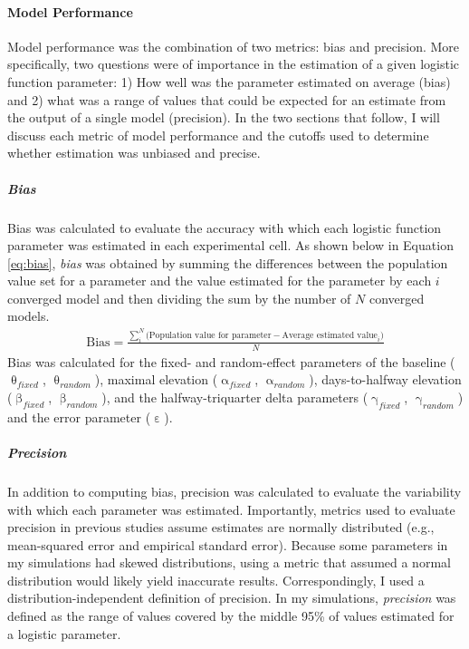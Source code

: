 \documentclass[
12pt, %
twoside,
english]{guelphthesis}
\begin{document}
\hypertarget{model-performance-1}{%
\paragraph{Model Performance}\label{model-performance-1}}

Model performance was the combination of two metrics: bias and precision. More specifically, two questions were of importance in the estimation of a given logistic function parameter: 1) How well was the parameter estimated on average (bias) and 2) what was a range of values that could be expected for an estimate from the output of a single model (precision). In the two sections that follow, I will discuss each metric of model performance and the cutoffs used to determine whether estimation was unbiased and precise.

\hypertarget{bias-comp}{%
\subparagraph{Bias}\label{bias-comp}}

Bias was calculated to evaluate the accuracy with which each logistic
function parameter was estimated in each experimental cell. As shown below in Equation
\eqref{eq:bias}, \emph{bias} was obtained by summing the differences
between the population value set for a parameter and the value estimated for the parameter by each \(i\) converged model and then dividing the sum by the number of \(N\) converged models.
\begin{align}
  \text{Bias} = \frac{\sum_i^N\text{(Population value for parameter} - \text{Average estimated value}_i)}{N}
  \label{eq:bias} 
\end{align}
\noindent Bias was calculated for the fixed- and random-effect parameters of the baseline (\(\uptheta_{fixed}\), \(\uptheta_{random}\)), maximal elevation (\(\upalpha_{fixed}\), \(\upalpha_{random}\)), days-to-halfway elevation (\(\upbeta_{fixed}\), \(\upbeta_{random}\)), and the halfway-triquarter delta parameters (\(\upgamma_{fixed}\), \(\upgamma_{random}\)) and the error parameter (\(\upepsilon\)).

\hypertarget{pres-precision}{%
\subparagraph{Precision}\label{pres-precision}}

In addition to computing bias, precision was calculated to evaluate the variability with which each parameter was estimated. Importantly, metrics used to evaluate precision in previous studies assume estimates are normally distributed (e.g., mean-squared error and empirical standard error). Because some parameters in my simulations had skewed distributions, using a metric that assumed a normal distribution would likely yield inaccurate results. Correspondingly, I used a distribution-independent definition of precision. In my simulations, \emph{precision} was defined as the range of values covered by the middle 95\% of values estimated for a logistic parameter.
\end{document}
